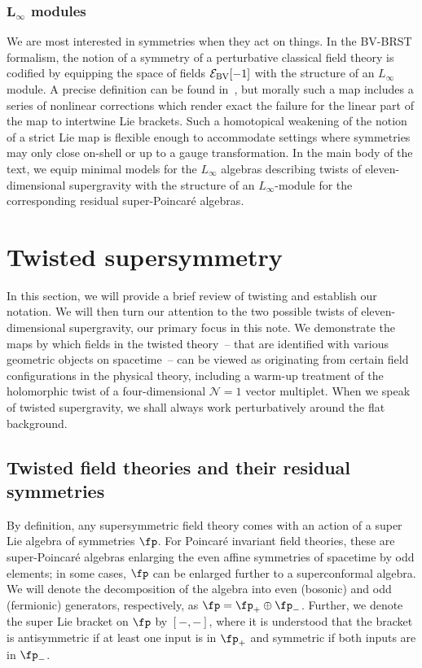 \documentclass[10pt,a4paper]{amsart}
\numberwithin{equation}{section}
\theoremstyle{definition}
\begin{document}
\subsubsection[L\_infty modules]{$\boldsymbol{ L_\infty}$ modules}
 We are most interested in symmetries when they act on things. In the BV-BRST formalism, the notion of a symmetry of a perturbative classical field theory is codified by equipping the space of fields $\mathcal{E}_{\rm BV}[-1]$ with the structure of an $L_\infty$ module. A precise definition can be found in~\cite{LadaMarkl}, but morally such a map includes a series of nonlinear corrections which render exact the failure for the linear part of the map to intertwine Lie brackets. Such a homotopical weakening of the notion of a strict Lie map is flexible enough to accommodate settings where symmetries may only close on-shell or up to a gauge transformation. In the main body of the text, we equip minimal models for the $L_\infty$ algebras describing twists of eleven-dimensional supergravity with the structure of an $L_\infty$-module for the corresponding residual super-Poincar\'e algebras.

\section{Twisted supersymmetry} \label{sec: twisted-susy}
In this section, we will provide a brief review of twisting and establish our notation. We will then turn our attention to the two possible twists of eleven-dimensional supergravity, our primary focus in this note. We demonstrate the maps by which fields in the twisted theory~-- that are identified with various geometric objects on spacetime~-- can be viewed as originating from certain field configurations in the physical theory, including a warm-up treatment of the holomorphic twist of a four-dimensional $\mathcal{N}=1$ vector multiplet. When we speak of twisted supergravity, we shall always work perturbatively around the flat background.

\subsection{Twisted field theories and their residual symmetries}
By definition, any supersymmetric field theory comes with an action of a super Lie algebra of symmetries $\fp$. For Poincar\'e invariant field theories, these are super-Poincar\'e algebras enlarging the even affine symmetries of spacetime by odd elements; in some cases, $\fp$ can be enlarged further to a superconformal algebra. We will denote the decomposition of the algebra into even (bosonic) and odd (fermionic) generators, respectively, as
$
 \fp = \fp_+ \oplus \fp_-$.
Further, we denote the super Lie bracket on $\fp$ by $[-,-]$, where it is understood that the bracket is antisymmetric if at least one input is in $\fp_+$ and symmetric if both inputs are in $\fp_-$.
\end{document}
